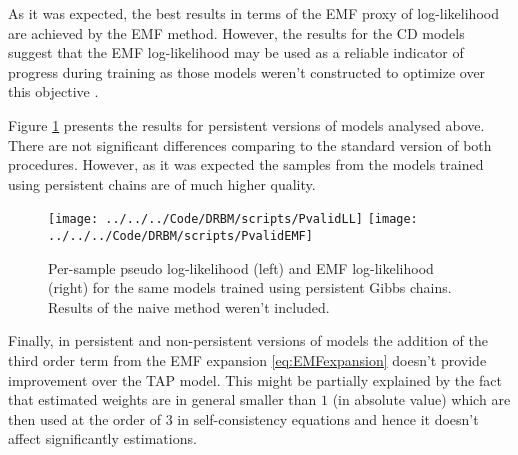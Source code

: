 As it was expected, the best results in terms of the EMF proxy of log-likelihood are achieved by the EMF method. However, the results for the CD models suggest that the EMF log-likelihood may be used as a reliable indicator of progress during training as those models weren't constructed to optimize over this objective \cite{gabrie2015training}.

Figure \ref{fig:PvalidLL} presents the results for persistent versions of models analysed above. There are not significant differences comparing to the standard version of both procedures. However, as it was expected the samples from the models trained using persistent chains are of much higher quality.
\begin{figure}[!htb]
 \texttt{[image: ../../../Code/DRBM/scripts/PvalidLL]}
\endminipage 
{}  
 \texttt{[image: ../../../Code/DRBM/scripts/PvalidEMF]}
\endminipage\hfill
  \caption[Comparison of log-likelihood estimates with persistent chains]{Per-sample pseudo log-likelihood (left) and EMF log-likelihood (right) for the same models trained using persistent Gibbs chains. Results of the naive method weren't included.}
   \label{fig:PvalidLL}
\end{figure}

Finally, in persistent and non-persistent versions of models the addition of the third order term from the EMF expansion \ref{eq:EMFexpansion} doesn't provide improvement over the TAP model. This might be partially explained by the fact that estimated weights are in general smaller than $1$ (in absolute value) which are then used at the order of $3$ in self-consistency equations and hence it doesn't affect significantly estimations.


